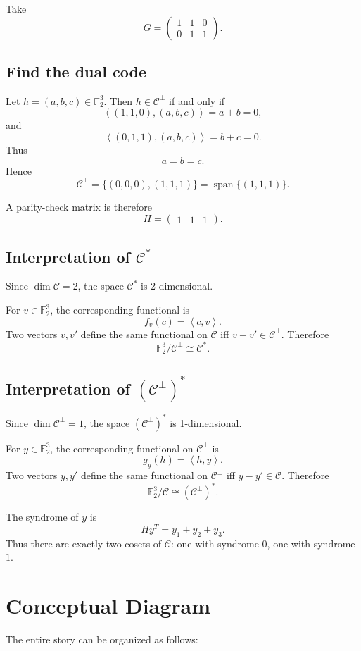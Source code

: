 \documentclass[11pt]{article}
\theoremstyle{remark}
\newcommand{\F}{\mathbb{F}}
\newcommand{\C}{\mathcal{C}}
\newcommand{\Cp}{\mathcal{C}^{\perp}}
\newcommand{\ip}[2]{\left\langle #1,#2\right\rangle}
\newcommand{\Span}{\operatorname{span}}
\begin{document}
	Take
	\[
	G=
	\begin{pmatrix}
		1&1&0\\
		0&1&1
	\end{pmatrix}.
	\]
	
	\subsection{Find the dual code}
	
	Let \(h=(a,b,c)\in \F_2^3\). Then \(h\in\Cp\) if and only if
	\[
	\ip{(1,1,0)}{(a,b,c)}=a+b=0,
	\]
	and
	\[
	\ip{(0,1,1)}{(a,b,c)}=b+c=0.
	\]
	Thus
	\[
	a=b=c.
	\]
	Hence
	\[
	\Cp=\{(0,0,0),(1,1,1)\}=\Span\{(1,1,1)\}.
	\]
	
	A parity-check matrix is therefore
	\[
	H=
	\begin{pmatrix}
		1&1&1
	\end{pmatrix}.
	\]
	
	\subsection{Interpretation of \(\C^*\)}
	
	Since \(\dim\C=2\), the space \(\C^*\) is 2-dimensional.
	
	For \(v\in \F_2^3\), the corresponding functional is
	\[
	f_v(c)=\ip{c}{v}.
	\]
	Two vectors \(v,v'\) define the same functional on \(\C\) iff \(v-v'\in\Cp\). Therefore
	\[
	\F_2^3/\Cp \cong \C^*.
	\]
	
	\subsection{Interpretation of \((\Cp)^*\)}
	
	Since \(\dim\Cp=1\), the space \((\Cp)^*\) is 1-dimensional.
	
	For \(y\in \F_2^3\), the corresponding functional on \(\Cp\) is
	\[
	g_y(h)=\ip{h}{y}.
	\]
	Two vectors \(y,y'\) define the same functional on \(\Cp\) iff \(y-y'\in\C\). Therefore
	\[
	\F_2^3/\C \cong (\Cp)^*.
	\]
	
	The syndrome of \(y\) is
	\[
	Hy^T = y_1+y_2+y_3.
	\]
	Thus there are exactly two cosets of \(\C\): one with syndrome \(0\), one with syndrome \(1\).
	
	\section{Conceptual Diagram}
	
	The entire story can be organized as follows:
	
\end{document}
